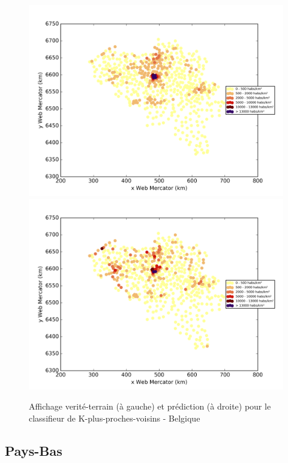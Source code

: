 \documentclass{book}
\begin{document}
\begin{figure}[H]
\centerline{
\includegraphics[scale=0.5]{../../data/Belgique/test/Nearest_Neighboors_Classification/Nearest_Neighboors_Classification/density_ground_truth.png}
\includegraphics[scale=0.5]{../../data/Belgique/test/Nearest_Neighboors_Classification/Nearest_Neighboors_Classification/density_classification.png}
}
\caption{Affichage verité-terrain (à gauche) et prédiction (à droite) pour le classifieur de K-plus-proches-voisins - Belgique}
\label{nn_carte_belgique}
\end{figure}

\subsection{Pays-Bas}
\end{document}
